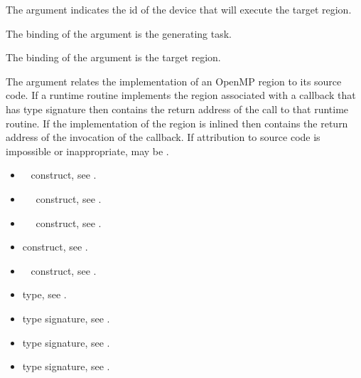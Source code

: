 The  argument indicates the id of the device that
will execute the target region.

The binding of the  argument is the generating task.

The binding of the  argument is the target region.

The  argument relates the implementation of an OpenMP region
to its source code. If a runtime routine implements the region associated with
a callback that has type signature  then
 contains the return address of the call to that runtime routine.
If the implementation of the region is inlined then  contains the
return address of the invocation of the callback. If attribution to source code
is impossible or inappropriate, may be .

\crossreferences
\begin{itemize}
\item {}~ construct, see .

\item {}~~ construct, 
see .

\item {}~~ construct, 
see .

\item {} construct, see .

\item {}~ construct, 
see .

\item {} type, see .

\item {} type signature, see .

\item {} type signature, see
.

\item {} type signature, see .
\end{itemize}



\label{sec:ompt_callback_device_load_t}

